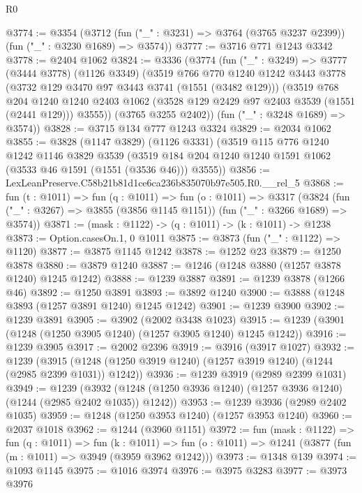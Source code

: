 \begin{lexlean}{R0}
\begin{coremodule}
@3774 := @3354
    (@3712 (fun ("_" : @3231) => @3764 (@3765 @3237 @2399)) (fun ("_" : @3230 @1689) => @3574))
@3777 := @3716 @771 @1243 @3342
@3778 := @2404 @1062
@3824 := @3336
    (@3774
      (fun ("_" : @3249) =>
      @3777
        (@3444 @3778)
        (@1126 @3349)
        (@3519
          @766
          @770
          @1240
          @1242
          @3443
          @3778
          (@3732 @129 @3470 @97 @3443 @3741 (@1551 (@3482 @129)))
          (@3519
            @768
            @204
            @1240
            @1240
            @2403
            @1062
            (@3528 @129 @2429 @97 @2403 @3539 (@1551 (@2441 @129)))
            @3555))
        (@3765 @3255 @2402))
      (fun ("_" : @3248 @1689) => @3574))
@3828 := @3715 @134 @777 @1243 @3324
@3829 := @2034 @1062
@3855 := @3828
    (@1147 @3829)
    (@1126 @3331)
    (@3519
      @115
      @776
      @1240
      @1242
      @1146
      @3829
      @3539
      (@3519 @184 @204 @1240 @1240 @1591 @1062 (@3533 @46 @1591 (@1551 (@3536 @46))) @3555))
@3856 := LexLeanPreserve.C58b21b81d1ce6ca236b835070b97e505.R0.__rel_5
@3868 := fun (t : @1011) =>
  fun (q : @1011) =>
  fun (o : @1011) =>
  @3317 (@3824 (fun ("_" : @3267) => @3855 (@3856 @1145 @1151)) (fun ("_" : @3266 @1689) => @3574))
@3871 := (mask : @1122) -> (q : @1011) -> (k : @1011) -> @1238
@3873 := Option.casesOn.{1, 0} @1011
@3875 := @3873 (fun ("_" : @1122) => @1120)
@3877 := @3875 @1145 @1242
@3878 := @1252 @23
@3879 := @1250 @3878
@3880 := @3879 @1240
@3887 := @1246 (@1248 @3880 (@1257 @3878 @1240) @1245 @1242)
@3888 := @1239 @3887
@3891 := @1239 @3878 (@1266 @46)
@3892 := @1250 @3891
@3893 := @3892 @1240
@3900 := @3888 (@1248 @3893 (@1257 @3891 @1240) @1245 @1242)
@3901 := @1239 @3900
@3902 := @1239 @3891
@3905 := @3902 (@2002 @3438 @1023)
@3915 := @1239 (@3901 (@1248 (@1250 @3905 @1240) (@1257 @3905 @1240) @1245 @1242))
@3916 := @1239 @3905
@3917 := @2002 @2396
@3919 := @3916 (@3917 @1027)
@3932 := @1239
    (@3915 (@1248 (@1250 @3919 @1240) (@1257 @3919 @1240) (@1244 (@2985 @2399 @1031)) @1242))
@3936 := @1239 @3919 (@2989 @2399 @1031)
@3949 := @1239
    (@3932 (@1248 (@1250 @3936 @1240) (@1257 @3936 @1240) (@1244 (@2985 @2402 @1035)) @1242))
@3953 := @1239 @3936 (@2989 @2402 @1035)
@3959 := @1248 (@1250 @3953 @1240) (@1257 @3953 @1240)
@3960 := @2037 @1018
@3962 := @1244 (@3960 @1151)
@3972 := fun (mask : @1122) =>
  fun (q : @1011) =>
  fun (k : @1011) => fun (o : @1011) => @1241 (@3877 (fun (m : @1011) => @3949 (@3959 @3962 @1242)))
@3973 := @1348 @139
@3974 := @1093 @1145
@3975 := @1016 @3974
@3976 := @3975 @3283
@3977 := @3973 @3976

\end{coremodule}
\end{lexlean}
